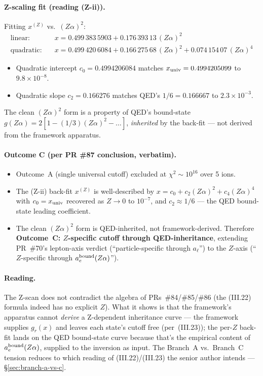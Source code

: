 \paragraph{Z-scaling fit (reading (Z-ii)).}
Fitting $x^{(Z)}$ vs.~$(Z\alpha)^2$:
\begin{align*}
\text{linear:}\quad     & x = 0.499\,383\,5903 + 0.176\,393\,13\,(Z\alpha)^2 \\
\text{quadratic:}\quad  & x = 0.499\,420\,6084 + 0.166\,275\,68\,(Z\alpha)^2
                          + 0.074\,154\,07\,(Z\alpha)^4
\end{align*}
\begin{itemize}[topsep=2pt,itemsep=0pt]
  \item Quadratic intercept $c_0 = 0.4994206084$ matches $x_{\rm univ} =
        0.4994205099$ to $9.8\times 10^{-8}$.
  \item Quadratic slope $c_2 = 0.166276$ matches QED's $1/6 = 0.166667$
        to $2.3\times 10^{-3}$.
\end{itemize}
The clean $(Z\alpha)^2$ form is a property of QED's bound-state
$g(Z\alpha) = 2[1 - (1/3)(Z\alpha)^2 - \dots]$, \emph{inherited} by the
back-fit --- not derived from the framework apparatus.

\paragraph{Outcome C (per PR \#87 conclusion, verbatim).}
\begin{itemize}[topsep=2pt,itemsep=0pt]
  \item Outcome~A (single universal cutoff) excluded at $\chi^2 \sim 10^{16}$
        over 5 ions.
  \item The (Z-ii) back-fit $x^{(Z)}$ is well-described by
        $x = c_0 + c_2(Z\alpha)^2 + c_4(Z\alpha)^4$ with $c_0 = x_{\rm univ}$
        recovered as $Z\to 0$ to $10^{-7}$, and $c_2 \approx 1/6$ ---
        the QED bound-state leading coefficient.
  \item The clean $(Z\alpha)^2$ form is QED-inherited, not framework-derived.
        Therefore \textbf{Outcome~C: $Z$-specific cutoff through QED-inheritance},
        extending PR~\#70's lepton-axis verdict (``particle-specific through
        $a_\ell$'') to the $Z$-axis (``$Z$-specific through
        $a_e^{\rm bound}(Z\alpha)$'').
\end{itemize}

\paragraph{Reading.}
The Z-scan does not contradict the algebra of PRs~\#84/\#85/\#86 (the
(III.22) formula indeed has no explicit $Z$). What it shows is that the
framework's apparatus cannot \emph{derive} a Z-dependent inheritance curve ---
the framework supplies $g_r(x)$ and leaves each state's cutoff free
(per~(III.23)); the per-$Z$ back-fit lands on the QED bound-state curve
because that's the empirical content of $a_e^{\rm bound}(Z\alpha)$, supplied
to the inversion as input. The Branch~A vs.~Branch~C tension reduces to
which reading of (III.22)/(III.23) the senior author intends ---
\S\ref{sec:branch-a-vs-c}.

